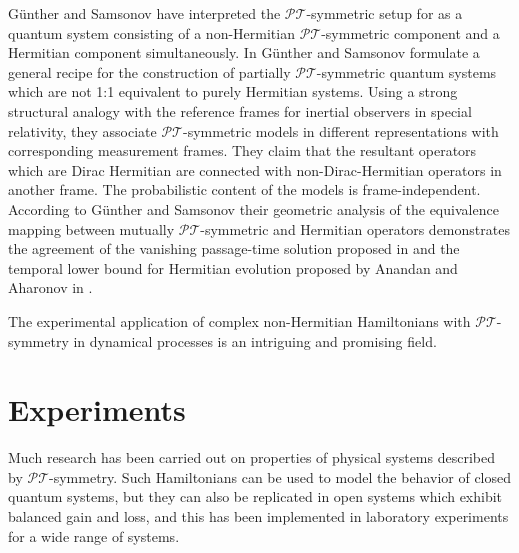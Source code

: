 \documentclass[12pt, a4paper]{report}
\newcommand\PT{\(\mathcal{PT}\)}
\begin{document}
G\"{u}nther and Samsonov have interpreted the \PT-symmetric setup for \cite{Bender_2007} as a quantum system
consisting of a non-Hermitian \PT-symmetric component and a Hermitian component simultaneously. In \cite{Gunther_2008} G\"{u}nther and Samsonov formulate a general recipe for the construction of partially \PT-symmetric quantum
systems which are not 1:1 equivalent to purely Hermitian systems. Using a strong structural analogy with the
reference frames for inertial observers in special relativity, they associate \PT-symmetric models in different
representations with corresponding measurement frames. They claim that the resultant operators which are Dirac Hermitian
are connected with non-Dirac-Hermitian operators in another frame. The probabilistic content of the models
is frame-independent. According to G\"{u}nther and Samsonov their geometric analysis of the equivalence mapping between mutually \PT-symmetric and Hermitian operators demonstrates the agreement of the vanishing passage-time solution proposed in \cite{Bender_2007} and the temporal lower bound for Hermitian evolution proposed by Anandan and Aharonov in \cite{AnandanAharonov}. 

The experimental application of complex non-Hermitian Hamiltonians with \PT-symmetry in dynamical processes is an intriguing and promising field. 

\chapter{Experiments}

Much research has been carried out on properties of physical systems described by \PT-symmetry. Such Hamiltonians can be used to model the behavior of closed quantum systems, but they can also be replicated in open systems which exhibit balanced gain and loss, and this has been implemented in laboratory experiments for a wide range of systems\cite{geometric_aspects}.  
\end{document}
